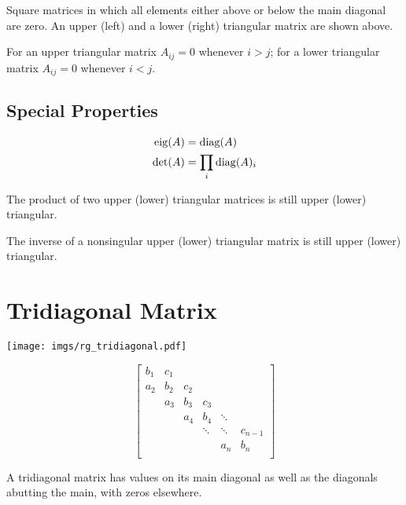 Square matrices in which all elements either above or below the main diagonal are zero. An upper (left) and a lower (right) triangular matrix are shown above.

For an upper triangular matrix $A_{ij}=0$ whenever $i>j$; for a lower triangular matrix $A_{ij}=0$ whenever $i<j$.


\subsection*{Special Properties}

\begin{align}
\operatorname{eig}(A) &= \operatorname{diag}(A)             \\
\det(A) &= \prod_i \operatorname{diag}(A)_i
\end{align}

The product of two upper (lower) triangular matrices is still upper (lower) triangular.

The inverse of a nonsingular upper (lower) triangular matrix is still upper (lower) triangular.


\section{Tridiagonal Matrix}

\begin{center}
\texttt{[image: imgs/rg\_tridiagonal.pdf]}
\end{center}

\begin{equation}
\begin{bmatrix}
b_1 & c_1 &     &        &        &         \\
a_2 & b_2 & c_2 &        &        &         \\
    & a_3 & b_3 & c_3    &        &         \\
    &     & a_4 & b_4    & \ddots &         \\
    &     &     & \ddots & \ddots & c_{n-1} \\
    &     &     &        & a_n    & b_n     \\
\end{bmatrix}
\end{equation}

A tridiagonal matrix has values on its main diagonal as well as the diagonals abutting the main, with zeros elsewhere.

